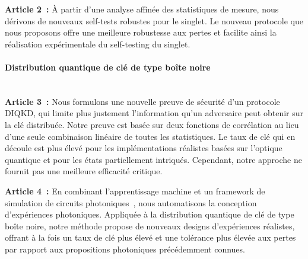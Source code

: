 \medbreak

\textbf{Article 2~\cite{Valcarce2022}:} 
À partir d'une analyse affinée des statistiques de mesure, nous dérivons de nouveaux self-tests robustes pour le singlet.
Le nouveau protocole que nous proposons offre une meilleure robustesse aux pertes et facilite ainsi la réalisation expérimentale du self-testing du singlet.


\paragraph{Distribution quantique de clé de type \guillemotleft boîte noire\guillemotright}\mbox{}\\


\textbf{Article 3~\cite{Sekatski2021}:}
Nous formulons une nouvelle preuve de sécurité d'un protocole DIQKD, qui limite plus justement l'information qu'un adversaire peut obtenir sur la clé distribuée.
Notre preuve est basée sur deux fonctions de corrélation au lieu d'une seule combinaison linéaire de toutes les statistiques.
Le taux de clé qui en découle est plus élevé pour les implémentations réalistes basées sur l'optique quantique et pour les états partiellement intriqués. 
Cependant, notre approche ne fournit pas une meilleure efficacité critique.

\medbreak

\textbf{Article 4~\cite{Valcarce2022b}:} 
En combinant l'apprentissage machine et un framework de simulation de circuits photoniques~\cite{Valcarce2021}, nous automatisons la conception d'expériences photoniques.
Appliquée à la distribution quantique de clé de type \guillemotleft boîte noire\guillemotright, notre méthode propose de nouveaux designs d'expériences réalistes, offrant à la fois un taux de clé plus élevé et une tolérance plus élevée aux pertes par rapport aux propositions photoniques précédemment connues.
